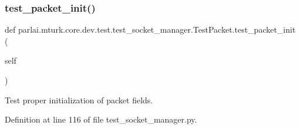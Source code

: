 \subsubsection{\texorpdfstring{test\+\_\+packet\+\_\+init()}{test\_packet\_init()}}
{\footnotesize\ttfamily def parlai.\+mturk.\+core.\+dev.\+test.\+test\+\_\+socket\+\_\+manager.\+Test\+Packet.\+test\+\_\+packet\+\_\+init (\begin{DoxyParamCaption}\item[{}]{self }\end{DoxyParamCaption})}

\begin{DoxyVerb}Test proper initialization of packet fields.
\end{DoxyVerb}
 

Definition at line 116 of file test\+\_\+socket\+\_\+manager.\+py.


